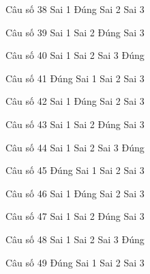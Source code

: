 \begin{ex}
Câu số 38
\choice
{Sai 1}
{\True Đúng}
{Sai 2}
{Sai 3}
\end{ex}

\begin{ex}
Câu số 39
\choice
{Sai 1}
{Sai 2}
{\True Đúng}
{Sai 3}
\end{ex}

\begin{ex}
Câu số 40
\choice
{Sai 1}
{Sai 2}
{Sai 3}
{\True Đúng}
\end{ex}
\begin{ex}
Câu số 41
\choice
{\True Đúng}
{Sai 1}
{Sai 2}
{Sai 3}
\end{ex}

\begin{ex}
Câu số 42
\choice
{Sai 1}
{\True Đúng}
{Sai 2}
{Sai 3}
\end{ex}

\begin{ex}
Câu số 43
\choice
{Sai 1}
{Sai 2}
{\True Đúng}
{Sai 3}
\end{ex}

\begin{ex}
Câu số 44
\choice
{Sai 1}
{Sai 2}
{Sai 3}
{\True Đúng}
\end{ex}
\begin{ex}
Câu số 45
\choice
{\True Đúng}
{Sai 1}
{Sai 2}
{Sai 3}
\end{ex}

\begin{ex}
Câu số 46
\choice
{Sai 1}
{\True Đúng}
{Sai 2}
{Sai 3}
\end{ex}

\begin{ex}
Câu số 47
\choice
{Sai 1}
{Sai 2}
{\True Đúng}
{Sai 3}
\end{ex}

\begin{ex}
Câu số 48
\choice
{Sai 1}
{Sai 2}
{Sai 3}
{\True Đúng}
\end{ex}
\begin{ex}
Câu số 49
\choice
{\True Đúng}
{Sai 1}
{Sai 2}
{Sai 3}
\end{ex}

